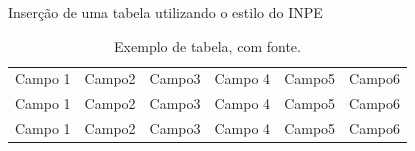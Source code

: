 \documentclass[10pt]{beamer}
\begin{document}

\begingroup
{}
\begin{frame}{}
    \begin{meucomandolf}{Inserção de uma tabela utilizando o estilo do INPE}
        \begin{table}[H] %
            \begin{center} %
            \caption{Exemplo de tabela, com fonte.}
            \begin{tabular}{l|l|c|c|r|r}
            \hline %
            Campo 1 & Campo2 & Campo3 & Campo 4 & Campo5 & Campo6 \\
            Campo 1 & Campo2 & Campo3 & Campo 4 & Campo5 & Campo6 \\
            Campo 1 & Campo2 & Campo3 & Campo 4 & Campo5 & Campo6 \\
            \hline %
            \end{tabular}
            \end{center}
        \end{table}
    \end{meucomandolf}
\end{frame}
\endgroup
\end{document}
